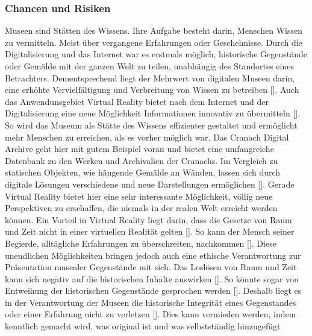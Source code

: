 \documentclass[a4paper,12pt,oneside]{article}
\begin{document}
      \subsubsection{Chancen und Risiken}
        Museen sind Stätten des Wissens. Ihre Aufgabe besteht darin, Menschen Wissen zu
        vermitteln. Meist über vergangene Erfahrungen oder Geschehnisse. Durch die
        Digitalisierung und das Internet war es erstmals möglich, historische Gegenstände
        oder Gemälde mit der ganzen Welt zu teilen, unabhängig des Standortes eines
        Betrachters. Dementsprechend liegt der Mehrwert von digitalen Museen darin, eine
        erhöhte Vervielfältigung und Verbreitung von Wissen zu betreiben [\cite[17]{Huennekens2002}].
        Auch das Anwendunsgebiet Virtual Reality bietet nach dem Internet und der Digitalisierung
        eine neue Möglichkeit Informationen innovativ zu übermitteln [\cite[52]{Heidsiek2019}].
        So wird das Museum als Stätte des Wissens effizienter gestaltet und ermöglicht 
        mehr Menschen
        zu erreichen, als es vorher möglich war. Das Cranach Digital Archive geht hier mit
        gutem Beispiel voran und bietet eine umfangreiche Datenbank
        zu den Werken und Archivalien der Cranachs.
        Im Vergleich zu statischen Objekten, wie hängende Gemälde an Wänden, lassen sich 
        durch digitale Lösungen verschiedene und neue Darstellungen ermöglichen [\cite[17]{Huennekens2002}].
        Gerade Virtual Reality bietet hier eine sehr interessante Möglichkeit, völlig neue
        Perspektiven zu erschaffen, die niemals in der realen Welt erreicht werden können.
        Ein Vorteil in Virtual Reality liegt darin, dass die Gesetze von Raum und Zeit nicht
        in einer virtuellen Realität gelten [\cite[140]{Huennekens2002}]. So kann der Mensch
        seiner Begierde, alltägliche Erfahrungen zu überschreiten, nachkommen [\cite[140]{Huennekens2002}].
        Diese unendlichen Möglichkeiten bringen jedoch auch eine ethische 
        Verantwortung zur Präsentation musealer Gegenstände mit sich.
        Das Loslösen von Raum und Zeit kann sich negativ auf die historischen Inhalte auswirken
        [\cite[141]{Huennekens2002}]. So könnte sogar von Entweihung der historischen
        Gegenstände gesprochen werden [\cite[141]{Huennekens2002}]. Deshalb liegt es in der 
        Verantwortung der
        Museen die historische Integrität eines Gegenstandes oder einer Erfahrung nicht
        zu verletzen [\cite[38]{Heidsiek2019}]. Dies kann vermieden werden, indem 
        kenntlich gemacht wird, was original ist und was selbstständig hinzugefügt
\end{document}
